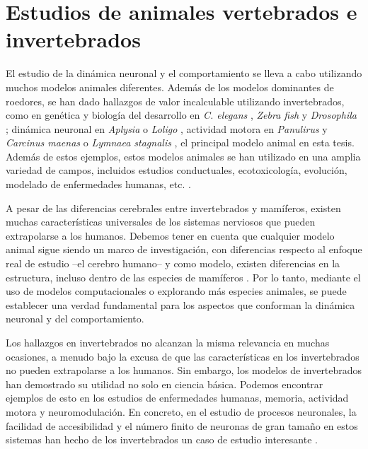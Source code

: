 \section{Estudios de animales vertebrados e invertebrados}
\label{c-intro-invertebrates spanish}
El estudio de la dinámica neuronal y el comportamiento se lleva a cabo utilizando muchos modelos animales diferentes. Además de los modelos dominantes de roedores, se han dado hallazgos de valor incalculable utilizando invertebrados, como en genética y biología del desarrollo en \textit{C. elegans} \parencite{brenner_genetics_1974}, \textit{Zebra fish} \parencite{streisinger_production_1981} y \textit{Drosophila} \parencite{nusslein-volhard_mutations_1980}; dinámica neuronal en \textit{Aplysia} \parencite{wachtel_direct_1967} o \textit{Loligo} \parencite{hodgkin_quantitative_1952}, actividad motora en \textit{Panulirus} \parencite{selverston_stomatogastric_1976} y \textit{Carcinus maenas} \parencite{eisen_mechanisms_1982} o \textit{Lymnaea stagnalis} \parencite{benjamin_central_1979}, el principal modelo animal en esta tesis. Además de estos ejemplos, estos modelos animales se han utilizado en una amplia variedad de campos, incluidos estudios conductuales, ecotoxicología, evolución, modelado de enfermedades humanas, etc. \parencite{romanova_animal_2018}.

A pesar de las diferencias cerebrales entre invertebrados y mamíferos, existen muchas características universales de los sistemas nerviosos que pueden extrapolarse a los humanos. Debemos tener en cuenta que cualquier modelo animal sigue siendo un marco de investigación, con diferencias respecto al enfoque real de estudio --el cerebro humano-- y como modelo, existen diferencias en la estructura, incluso dentro de las especies de mamíferos \parencite{preuss_taking_2000}. Por lo tanto, mediante el uso de modelos computacionales o explorando más especies animales, se puede establecer una verdad fundamental para los aspectos que conforman la dinámica neuronal y del comportamiento.

Los hallazgos en invertebrados no alcanzan la misma relevancia en muchas ocasiones, a menudo bajo la excusa de que las características en los invertebrados no pueden extrapolarse a los humanos. Sin embargo, los modelos de invertebrados han demostrado su utilidad no solo en ciencia básica. Podemos encontrar ejemplos de esto en los estudios de enfermedades humanas, memoria, actividad motora y neuromodulación. En concreto, en el estudio de procesos neuronales, la facilidad de accesibilidad y el número finito de neuronas de gran tamaño en estos sistemas han hecho de los invertebrados un caso de estudio interesante \parencite{gelperin_recent_2019}.


